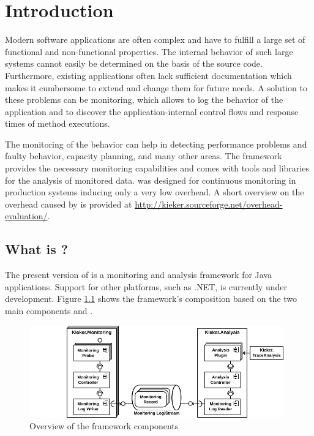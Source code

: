%


\chapter{Introduction}\label{chap:introduction}

Modern software applications are often complex and have to fulfill a large set of functional and non-functional properties. The internal behavior of such large systems cannot easily be determined on the basis of the source code. Furthermore, existing applications often lack sufficient documentation which makes it cumbersome to extend and change them for future needs. A solution to these problems can be monitoring, which allows to log the behavior of the application and to discover the application-internal control flows and response times of method executions.

The monitoring of the behavior can help in detecting performance problems and faulty behavior, capacity planning, and many other areas. The \Kieker{} framework provides the necessary monitoring capabilities and comes with tools and libraries for the analysis of monitored data. \Kieker{} was designed for %
continuous monitoring in production systems inducing only a very low overhead. A short overview on the overhead caused by \Kieker{} is provided at \url{http://kieker.sourceforge.net/overhead-evaluation/}.

\section{What is \Kieker?}\label{sec:kieker}

The present version of \Kieker{} is a monitoring and analysis framework for %
Java applications. %
Support for other platforms, such as .NET, is currently under development. %
Figure \ref{fig:KiekerComponentDiagram} shows the framework's composition based %
on the two main components \KiekerMonitoringPart{} and \KiekerAnalysisPart{}. %

\begin{figure}[H]\centering
\includegraphics[width=0.98\textwidth]{images/kiekerComponentDiagram-woCloud-bw-w-record-newNames-withTraceAnalysis}
\caption{Overview of the framework components}
\label{fig:KiekerComponentDiagram}
\end{figure}
		
